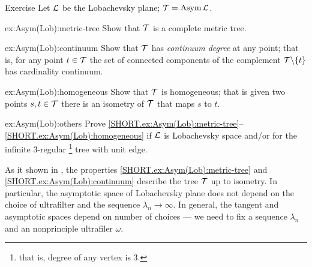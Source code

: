 \begin{thm}{Exercise}\label{ex:Asym(Lob)}
Let $\mathcal{L}$ be the Lobachevsky plane; $\mathcal{T}=\mathop{\rm Asym}\nolimits\mathcal{L}$.

\begin{subthm}{ex:Asym(Lob):metric-tree}
Show that $\mathcal{T}$ is a complete metric tree.
\end{subthm}

\begin{subthm}{ex:Asym(Lob):continuum}
Show that $\mathcal{T}$ has {}\emph{continuum degree} at any point;
that is, for any point $t\in \mathcal{T}$ the set of connected components of the complement $\mathcal{T}\backslash\{t\}$ has cardinality continuum.
\end{subthm}

\begin{subthm}{ex:Asym(Lob):homogeneous}
Show that $\mathcal{T}$ is homogeneous; that is given two points $s,t\in \mathcal{T}$ there is an isometry of $\mathcal{T}$ that maps $s$ to $t$.
\end{subthm}

\begin{subthm}{ex:Asym(Lob):others}
Prove \ref{SHORT.ex:Asym(Lob):metric-tree}--\ref{SHORT.ex:Asym(Lob):homogeneous} if $\mathcal{L}$ is Lobachevsky space and/or for the infinite 3-regular%
\footnote{that is, degree of any vertex is 3.}
tree with unit edge. 
\end{subthm}


\end{thm}

As it shown in \cite{dyubina-polterovich}, the properties \ref{SHORT.ex:Asym(Lob):metric-tree} and \ref{SHORT.ex:Asym(Lob):continuum} describe the tree $\mathcal{T}$ up to isometry.
In particular, the asymptotic space of Lobachevsky plane does not depend on the choice of ultrafilter and the sequence $\lambda_n\to \infty$.
In general, the tangent and asymptotic spaces depend on number of choices --- we need to fix a sequence $\lambda_n$ and an nonprinciple ultrafiler $\omega$.
